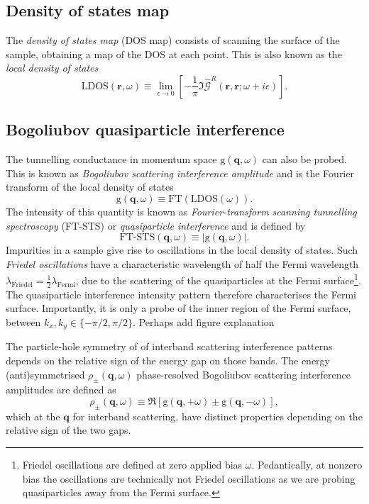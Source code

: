 \subsection{Density of states map}
The \textit{density of states map} (DOS map) consists of scanning the surface of the sample, obtaining a map of the DOS at each point. This is also known as the \textit{local density of states}
\begin{equation}
\text{LDOS}\left({\mathbf r}, \omega\right)
\equiv
 \lim_{\epsilon\rightarrow0}\left[
 -\frac{1}{\pi}\Im
\hat{\mathcal{G}}^R\left(\mathbf{r}, \mathbf{r}; \omega+i\epsilon \right)
\right].
\end{equation}

\subsection{Bogoliubov quasiparticle interference}
The tunnelling conductance in momentum space $\text{g}(\mathbf{q}, \omega)$ can also be probed. This is known as \textit{Bogoliubov scattering interference amplitude} and is the Fourier transform of the local density of states
\begin{equation}
\text{g}(\mathbf{q}, \omega)
\equiv 
\text{FT}\left(
\text{LDOS}(\omega)
\right).
\end{equation}
The intensity of this quantity is known as \textit{Fourier-transform scanning tunnelling spectroscopy} (FT-STS) or \textit{quasiparticle interference} and is defined by
\begin{equation}
\text{FT-STS}(\mathbf{q}, \omega)
\equiv
|\text{g}(\mathbf{q}, \omega)|.
\end{equation}
Impurities in a sample give rise to oscillations in the local density of states. Such \textit{Friedel oscillations} have a characteristic wavelength of half the Fermi wavelength $\lambda_\text{Friedel}=\frac{1}{2}\lambda_\text{Fermi}$, due to the scattering of the quasiparticles at the Fermi surface\footnote{Friedel oscillations are defined at zero applied bias $\omega$. Pedantically, at nonzero bias the oscillations are technically not Friedel oscillations as we are probing quasiparticles away from the Fermi surface.}.
The quasiparticle interference intensity pattern therefore characterises the Fermi surface. Importantly, it is only a probe of the inner region of the Fermi surface, between $k_x, k_y\in\{-\pi/2,\pi/2\}$. {\color{red}Perhaps add figure explanation}

The particle-hole symmetry of of interband scattering interference patterns depends on the relative sign of the energy gap on those bands. The energy (anti)symmetrised $\rho_\pm(\mathbf{q},\omega)$ phase-resolved Bogoliubov scattering interference amplitudes \cite{Sprau2017} are defined as
\begin{equation}
\rho_\pm(\mathbf{q}, \omega) 
\equiv
 \Re\left[\text{g}(\mathbf{q}, +\omega)
\pm 
\text{g}(\mathbf{q}, -\omega)\right],
\end{equation}
which at the $\mathbf{q}$ for interband scattering, have distinct properties depending on the relative sign of the two gaps.

